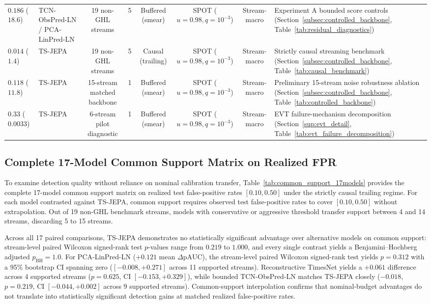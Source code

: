\begin{table}[t]
\begin{tabular}{@{}llcccccp{4.8cm}@{}}
$0.186$ ($18.6$) & TCN-ObsPred-LN / PCA-LinPred-LN & 19 non-GHL streams & 5 & Buffered (smear) & SPOT ($u{=}0.98, q{=}10^{-3}$) & Stream-macro & Experiment A bounded score controls (Section~\ref{subsec:controlled_backbone}, Table~\ref{tab:residual_diagnostics}) \\
$0.014$ ($1.4$) & TS-JEPA & 19 non-GHL streams & 5 & Causal (trailing) & SPOT ($u{=}0.98, q{=}10^{-3}$) & Stream-macro & Strictly causal streaming benchmark (Section~\ref{subsec:controlled_backbone}, Table~\ref{tab:causal_benchmark}) \\
$0.118$ ($11.8$) & TS-JEPA & 15-stream matched backbone & 1 & Buffered (smear) & SPOT ($u{=}0.98, q{=}10^{-3}$) & Stream-macro & Preliminary 15-stream noise robustness ablation (Section~\ref{subsec:controlled_backbone}, Table~\ref{tab:controlled_backbone}) \\
$0.33$ ($0.0033$) & TS-JEPA & 6-stream pilot diagnostic & 1 & Buffered (smear) & SPOT ($u{=}0.98, q{=}10^{-3}$) & Stream-macro & EVT failure-mechanism decomposition (Section~\ref{sup:evt_detail}, Table~\ref{tab:evt_failure_decomposition}) \\
\bottomrule
\end{tabular}
\end{table}

\subsection{Complete 17-Model Common Support Matrix on Realized FPR}
\label{subsec:common_support_17models}
To examine detection quality without reliance on nominal calibration transfer, Table~\ref{tab:common_support_17models} provides the complete 17-model common support matrix on realized test false-positive rates $[0.10, 0.50]$ under the strictly causal trailing regime. For each model contrasted against TS-JEPA, common support requires observed test false-positive rates to cover $[0.10, 0.50]$ without extrapolation. Out of 19 non-GHL benchmark streams, models with conservative or aggressive threshold transfer support between 4 and 14 streams, discarding 5 to 15 streams.

Across all 17 paired comparisons, TS-JEPA demonstrates no statistically significant advantage over alternative models on common support: stream-level paired Wilcoxon signed-rank test $p$-values range from $0.219$ to $1.000$, and every single contrast yields a Benjamini--Hochberg adjusted $p_{\mathrm{BH}} = 1.0$. For PCA-LinPred-LN ($+0.121$ mean $\Delta\mathrm{pAUC}$), the stream-level paired Wilcoxon signed-rank test yields $p = 0.312$ with a 95\% bootstrap CI spanning zero ($[-0.008, +0.271]$ across 11 supported streams). Reconstructive TimesNet yields a $+0.061$ difference across 4 supported streams ($p = 0.625$, CI $[-0.153, +0.329]$), while bounded TCN-ObsPred-LN matches TS-JEPA closely ($-0.018$, $p = 0.219$, CI $[-0.044, +0.002]$ across 9 supported streams). Common-support interpolation confirms that nominal-budget advantages do not translate into statistically significant detection gains at matched realized false-positive rates.

